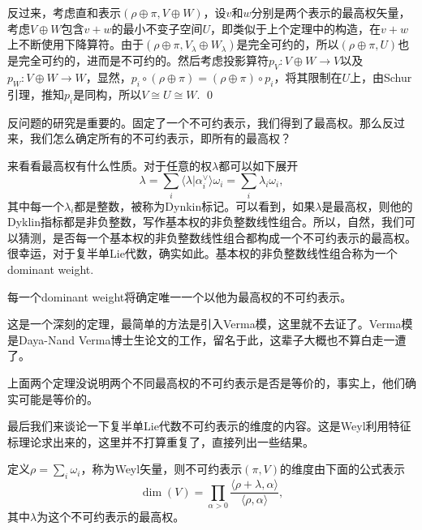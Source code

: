 \documentclass[9pt]{extarticle}
\begin{document}
反过来，考虑直和表示$(\rho\oplus\pi,V\oplus W)$，设$v$和$w$分别是两个表示的最高权矢量，考虑$V\oplus W$包含$v+w$的最小不变子空间$U$，即类似于上个定理中的构造，在$v+w$上不断使用下降算符。由于$(\rho\oplus\pi,V_\lambda\oplus W_\lambda)$是完全可约的，所以$(\rho\oplus\pi,U)$也是完全可约的，进而是不可约的。然后考虑投影算符$p_V:V\oplus W\to V$以及$p_W:V\oplus W\to W$，显然，$p_i\circ (\rho\oplus\pi)=(\rho\oplus\pi)\circ p_i$，将其限制在$U$上，由Schur引理，推知$p_i$是同构，所以$V\cong U\cong W$. \qed

\para 反问题的研究是重要的。固定了一个不可约表示，我们得到了最高权。那么反过来，我们怎么确定所有的不可约表示，即所有的最高权？

来看看最高权有什么性质。对于任意的权$\lambda$都可以如下展开
\[
	\lambda=\sum_i \langle \lambda|\alpha_i^\vee\rangle \omega_i=\sum_i \lambda_i \omega_i,
\]
其中每一个$\lambda_i$都是整数，被称为Dynkin标记。可以看到，如果$\lambda$是最高权，则他的Dyklin指标都是非负整数，写作基本权的非负整数线性组合。所以，自然，我们可以猜测，是否每一个基本权的非负整数线性组合都构成一个不可约表示的最高权。很幸运，对于复半单Lie代数，确实如此。基本权的非负整数线性组合称为一个dominant weight.



\theo 每一个dominant weight将确定唯一一个以他为最高权的不可约表示。

这是一个深刻的定理，最简单的方法是引入Verma模，这里就不去证了。Verma模是Daya-Nand Verma博士生论文的工作，留名于此，这辈子大概也不算白走一遭了。

上面两个定理没说明两个不同最高权的不可约表示是否是等价的，事实上，他们确实可能是等价的。

\para 最后我们来谈论一下复半单Lie代数不可约表示的维度的内容。这是Weyl利用特征标理论求出来的，这里并不打算重复了，直接列出一些结果。

定义$\rho=\sum_i \omega_i$，称为Weyl矢量，则不可约表示$(\pi,V)$的维度由下面的公式表示
\[
	\dim(V)=\prod_{\alpha>0}\frac{\langle \rho+\lambda,\alpha\rangle}{\langle \rho,\alpha\rangle},
\]
其中$\lambda$为这个不可约表示的最高权。
\end{document}
